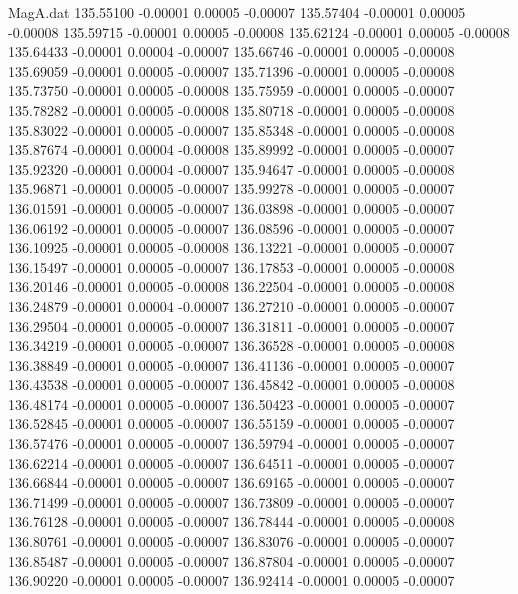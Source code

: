 \begin{filecontents}{MagA.dat}
 135.55100   -0.00001    0.00005   -0.00007
 135.57404   -0.00001    0.00005   -0.00008
 135.59715   -0.00001    0.00005   -0.00008
 135.62124   -0.00001    0.00005   -0.00008
 135.64433   -0.00001    0.00004   -0.00007
 135.66746   -0.00001    0.00005   -0.00008
 135.69059   -0.00001    0.00005   -0.00007
 135.71396   -0.00001    0.00005   -0.00008
 135.73750   -0.00001    0.00005   -0.00008
 135.75959   -0.00001    0.00005   -0.00007
 135.78282   -0.00001    0.00005   -0.00008
 135.80718   -0.00001    0.00005   -0.00008
 135.83022   -0.00001    0.00005   -0.00007
 135.85348   -0.00001    0.00005   -0.00008
 135.87674   -0.00001    0.00004   -0.00008
 135.89992   -0.00001    0.00005   -0.00007
 135.92320   -0.00001    0.00004   -0.00007
 135.94647   -0.00001    0.00005   -0.00008
 135.96871   -0.00001    0.00005   -0.00007
 135.99278   -0.00001    0.00005   -0.00007
 136.01591   -0.00001    0.00005   -0.00007
 136.03898   -0.00001    0.00005   -0.00007
 136.06192   -0.00001    0.00005   -0.00007
 136.08596   -0.00001    0.00005   -0.00007
 136.10925   -0.00001    0.00005   -0.00008
 136.13221   -0.00001    0.00005   -0.00007
 136.15497   -0.00001    0.00005   -0.00007
 136.17853   -0.00001    0.00005   -0.00008
 136.20146   -0.00001    0.00005   -0.00008
 136.22504   -0.00001    0.00005   -0.00008
 136.24879   -0.00001    0.00004   -0.00007
 136.27210   -0.00001    0.00005   -0.00007
 136.29504   -0.00001    0.00005   -0.00007
 136.31811   -0.00001    0.00005   -0.00007
 136.34219   -0.00001    0.00005   -0.00007
 136.36528   -0.00001    0.00005   -0.00008
 136.38849   -0.00001    0.00005   -0.00007
 136.41136   -0.00001    0.00005   -0.00007
 136.43538   -0.00001    0.00005   -0.00007
 136.45842   -0.00001    0.00005   -0.00008
 136.48174   -0.00001    0.00005   -0.00007
 136.50423   -0.00001    0.00005   -0.00007
 136.52845   -0.00001    0.00005   -0.00007
 136.55159   -0.00001    0.00005   -0.00007
 136.57476   -0.00001    0.00005   -0.00007
 136.59794   -0.00001    0.00005   -0.00007
 136.62214   -0.00001    0.00005   -0.00007
 136.64511   -0.00001    0.00005   -0.00007
 136.66844   -0.00001    0.00005   -0.00007
 136.69165   -0.00001    0.00005   -0.00007
 136.71499   -0.00001    0.00005   -0.00007
 136.73809   -0.00001    0.00005   -0.00007
 136.76128   -0.00001    0.00005   -0.00007
 136.78444   -0.00001    0.00005   -0.00008
 136.80761   -0.00001    0.00005   -0.00007
 136.83076   -0.00001    0.00005   -0.00007
 136.85487   -0.00001    0.00005   -0.00007
 136.87804   -0.00001    0.00005   -0.00007
 136.90220   -0.00001    0.00005   -0.00007
 136.92414   -0.00001    0.00005   -0.00007

\end{filecontents}
